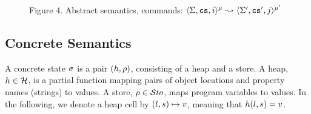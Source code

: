 \begin{figure}[t!]
{}
 \vspace*{-0.52cm}
 \captionsetup{format=nastyCaption}
\caption*{{\small Figure 4. Abstract semantics, commands: $\langle \Sigma, \mathtt{cs}, i \rangle^{\mu} \leadsto_{} \langle \Sigma', \mathtt{cs}', j \rangle^{\mu'}$}}\label{abs:sem:cmds:fig}
\vspace*{-0.6cm}
\end{figure}

\vspace*{-0.2cm}
\subsection{\jsil Concrete Semantics}
\label{subsec:concr}
A \jsil concrete state $\sigma$ is a pair $(h, \rho)$, consisting of a heap and a store. 
A heap, $h \in {\mathcal H}$, is a partial function mapping pairs of  object locations and property names (strings) to \jsil values.
A store, $\rho \in \mathcal{S}to$, maps program variables to \jsil values. 
In the following, we denote a heap cell by $(l, s) \mapsto v$, meaning that $h(l, s) = v$.

